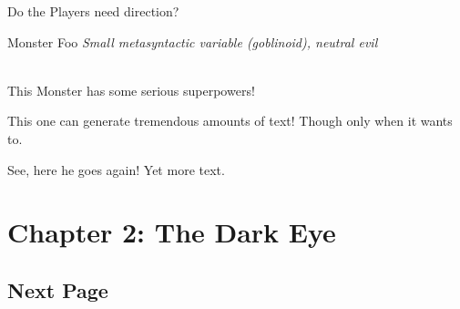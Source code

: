 \documentclass[10pt,%
	a4paper,%
	twoside,%
	twocolumn,%
	openany%
	]{book}
\begin{document}
\begin{paperbox}{Do the Players need direction?}
	\lipsum[1]
\end{paperbox}

\begin{monsterbox}{Monster Foo}
	\textit{Small metasyntactic variable (goblinoid), neutral evil}\\
	\hline
	\basics[%
	armorclass = 12,
	hitpoints  = 16 (3d8 + 3),
	speed      = 50 ft
	]
	\hline
	\stats[
    STR = \stat{12}, %
    DEX = \stat{7}
	]
	\hline
	\details[%
	languages = {Common Lisp, Erlang},
	]
	\hline \\[1mm]
	\begin{monsteraction}
		This Monster has some serious superpowers!
	\end{monsteraction}
	\begin{monsteraction}
		This one can generate tremendous amounts of text! Though only when it wants to.
	\end{monsteraction}

	\begin{monsteraction}
    See, here he goes again! Yet more text.
	\end{monsteraction}
\end{monsterbox}

\chapter{Chapter 2: The Dark Eye}

\section{Next Page}
\lipsum[1] %

\pagebreak

\lipsum[1] %

\pagebreak

\lipsum[1] %

\pagebreak

\lipsum[1] %

\pagebreak

\lipsum[1] %

\pagebreak

\lipsum[1] %

\backmatter

\lipsum[1] %

\end{document}
